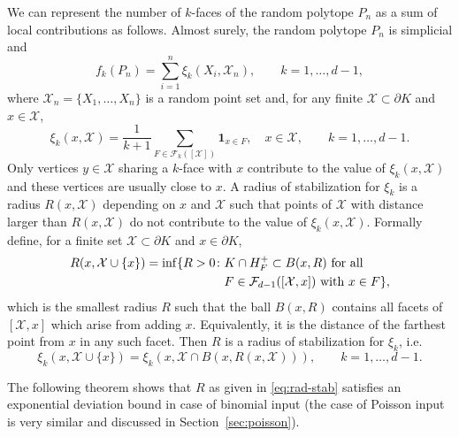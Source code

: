 \documentclass[12pt]{article}
\def\cF{{\mathcal F}}
\def\cX{{\mathcal X}}
\def\bd{{\partial}}
\theoremstyle{definition}
\begin{document}
We can represent the number of $k$-faces of the random polytope $P_n$ as a sum of local contributions as follows. Almost surely, the random polytope $P_n$ is simplicial and 
\begin{equation} \label{eq:score}
f_k(P_n)=\sum_{i=1}^n\xi_k(X_i,\cX_n),\qquad k=1,\dots,d-1,
\end{equation}
where $\cX_n=\{X_1,\dots,X_n\}$ is a random point set and, for any finite $\cX\subset \bd K$ and $x\in \cX$, 
\begin{equation*} 
\xi_k(x,\cX)=\frac{1}{k+1}\sum_{F\in \cF_k([\cX])} \mathbf{1}_{x\in F},\quad x\in \cX,\qquad k=1,\dots,d-1.
\end{equation*}
Only vertices $y\in \cX$ sharing a $k$-face with $x$ contribute to the value of $\xi_k(x,\cX)$ and these vertices are usually close to $x$. A radius of stabilization for $\xi_k$ is a radius $R(x,\cX)$ depending on $x$ and $\cX$ such that points of $\cX$ with distance larger than $R(x,\cX)$ do not contribute to the value of $\xi_k(x,\cX)$. Formally define, for a finite set $\cX\subset \bd K$ and $x\in \bd K$,
\begin{align} \label{eq:rad-stab}
R(x,\cX\cup \{x\})=\inf\{R>0\colon  &K\cap H_F^+\subset B(x,R) \text{ for all }\notag\\
&F\in \cF_{d-1}([\cX,x]) \text{ with }x\in F\},
\end{align}
which is the smallest radius $R$ such that the ball $B(x,R)$ contains all facets of $[\cX,x]$ which arise from adding $x$. Equivalently, it is the distance of the farthest point from $x$ in any such facet. Then $R$ is a radius of stabilization for $\xi_k$, i.e. 
\[
\xi_k(x,\cX\cup\{x\})
=\xi_k(x,\cX\cap B(x,R(x,\cX))), \qquad k=1,\dots,d-1.
\]

The following theorem shows that $R$ as given in \eqref{eq:rad-stab} satisfies an exponential deviation bound in case of binomial input (the case of Poisson input is very similar and discussed in Section~\ref{sec:poisson}).
\end{document}
